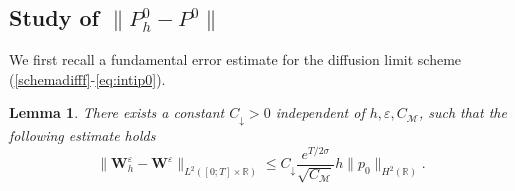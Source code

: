 \documentclass[a4paper,french,english,10pt]{article}
\newcommand\eps{\varepsilon}
\newcommand\W{\mathbf{W}}
\newtheorem{lemma}[theorem]{Lemma}
\begin{document}
\subsection{Study of $\| P_h^0 - P^0  \|$}

We  first 
 recall a fundamental   error estimate \cite{FV}
for the diffusion limit scheme (\ref{schemadifff}-\ref{eq:intip0}). 

\begin{lemma}\label{ds1d}
There exists a constant $C_\downarrow >0$ independent
of  %
 $h,\eps,C_\mathcal M$, such that the following estimate holds
\begin{equation}\label{esti_p_h_0_p_0}
\|\W_h^\eps-\W^\eps\|_{L^2([0;T]\times \mathbb{R})} \leq %
C_\downarrow  \frac{e^{T/2\sigma} }{\sqrt{C_{\mathcal{M}}}}
h \|p_0\|_{H^2(\mathbb{R})}.
\end{equation}
\end{lemma}
\end{document}
